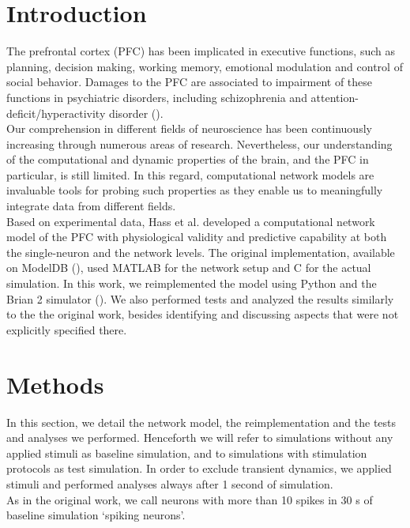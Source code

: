 \section*{Introduction}
The prefrontal cortex (PFC) has been implicated in executive functions, such as planning, decision making, working memory, emotional modulation and control of social behavior. Damages to the PFC are associated to impairment of these functions in psychiatric disorders, including schizophrenia and attention-deficit/hyperactivity disorder (\cite{wise08for,kandel13pri,bang18dis}). \\

Our comprehension in different fields of neuroscience has been continuously increasing through numerous areas of research. Nevertheless, our understanding of the computational and dynamic properties of the brain, and the PFC in particular, is still limited. In this regard, computational network models are invaluable tools for probing such properties as they enable us to meaningfully integrate data from different fields.\\

Based on experimental data, Hass et al. \cite{Hass2016} developed a computational network model of the PFC with physiological validity and predictive capability at both the single-neuron and the network levels. The original implementation, available on ModelDB (\cite{ModelDB}), used MATLAB for the network setup and C for the actual simulation. In this work, we reimplemented the model using Python and the Brian 2 simulator (\cite{stimberg19bri}). We also performed tests and analyzed the results similarly to the the original work, besides identifying and discussing aspects that were not explicitly specified there.\\

\section*{Methods}
In this section, we detail the network model, the reimplementation and the tests and analyses we performed. Henceforth we will refer to simulations without any applied stimuli as baseline simulation, and to simulations with stimulation protocols as test simulation. In order to exclude transient dynamics, we applied stimuli and performed analyses always after 1 second of simulation.\\

As in the original work, we call neurons with more than 10 spikes in 30 s of baseline simulation `spiking neurons'. \\


